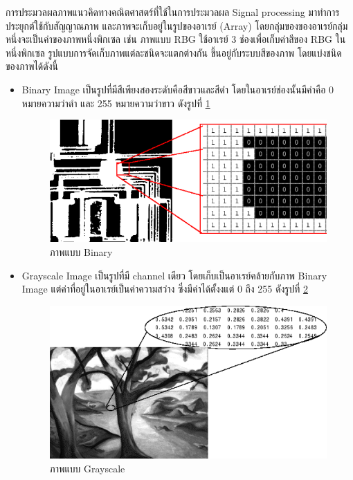	การประมวลผลภาพแนวคิดทางคณิตศาสตร์ที่ใช้ในการประมวลผล Signal processing 
	มาทำการประยุกต์ใช้กับสัญญาณภาพ และภาพจะเก็บอยู่ในรูปของอาเรย์ (Array) 
	โดยกลุ่มของของอาเรย์กลุ่มหนึ่งจะเป็นค่าของภาพหนึ่งพิกเซล 
	เช่น ภาพแบบ RBG ใช้อาเรย์ 3 ช่องเพื่อเก็บค่าสีของ RBG ในหนึ่งพิกเซล รูปแบบการจัดเก็บภาพแต่ละชนิดจะแตกต่างกัน 
	ขึ้นอยู่กับระบบสีของภาพ โดยแบ่งชนิดของภาพได้ดังนี้
	\begin{itemize}
		\item Binary Image เป็นรูปที่มีสีเพียงสองระดับคือสีขาวและสีดำ 
		โดยในอาเรย์ช่องนั้นมีค่าคือ 0 หมายความว่าดำ และ 255 หมายความว่าขาว
		ดังรูปที่ \ref{Fig:binary-image }
		\begin{figure}[H]
			\centering
			\includegraphics[scale=0.7]{Figures/2/binary-image}
			\caption{ภาพแบบ Binary }
			\label{Fig:binary-image }
		\end{figure}
		
		\item Grayscale Image เป็นรูปที่มี channel เดียว 
		โดยเก็บเป็นอาเรย์คล้ายกับภาพ Binary Image 
		แต่ค่าที่อยู่ในอาเรย์เป็นค่าความสว่าง ซึ่งมีค่าได้ตั้งงแต่ 0 ถึง 255
		ดังรูปที่ \ref{Fig:grayscale-image }
		\begin{figure}[H]
			\centering
			\includegraphics[scale=0.7]{Figures/2/grayscale-image}
			\caption{ ภาพแบบ Grayscale }
			\label{Fig:grayscale-image }
		\end{figure}
		

\end{itemize}
